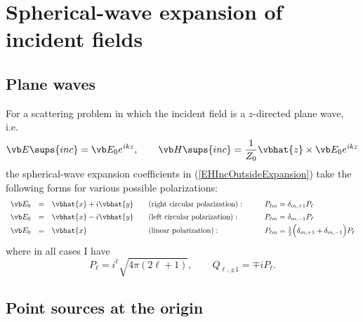 \documentclass[letterpaper]{article}
\newcommand{\lm}{_{\ell m}}
\begin{document}
\section{Spherical-wave expansion of incident fields}
\label{IncidentFieldSection}

\subsection{Plane waves}
\label{PlaneWaveSection}

For a scattering problem in which the incident field
is a $z$-directed plane wave, i.e.
$$
 \vb E\sups{inc}=\vb E_0e^{ik z}, \qquad 
 \vb H\sups{inc}=\frac{1}{Z_0}\vbhat{z}\times \vb E_0 e^{ik z}
$$
the spherical-wave expansion coefficients in (\ref{EHIncOutsideExpansion})
take the following forms for various possible polarizations:
$$\begin{array}{rclll}
\vb E_0 &=& \vbhat{x} + i\vbhat{y} 
 \quad &\text{(right circular polarization)}:
 \qquad &P\lm=\delta_{m,+1}P_\ell
\\[5pt]
\vb E_0 &=& \vbhat{x} - i\vbhat{y} 
 \quad &\text{(left circular polarization)}:
 \qquad &P\lm=\delta_{m,-1}P_\ell 
\\[3pt]
\vb E_0 &=& \vbhat{x}
 \quad &\text{(linear polarization)}:
 \qquad &P\lm=\frac{1}{2}\Big(\delta_{m,+1} + \delta_{m,-1}\Big)P_\ell 
\end{array}$$
where in all cases I have
$$ P_\ell = i^\ell \sqrt{4\pi(2\ell +1)}, \qquad  
   Q_{\ell, \pm 1} = \mp i P_\ell.
$$

\subsection{Point sources at the origin}
\label{PointSourceAtOriginSection}
\end{document}
